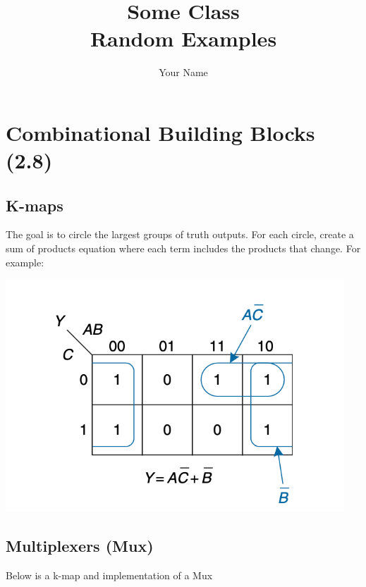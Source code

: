 \documentclass[12pt]{report}
\title{\Huge{Some Class}\\Random Examples}
\author{\huge{Your Name}}
\date{}
\begin{document}
\chapter{Combinational Building Blocks (2.8)}
\section{K-maps}

The goal is to circle the largest groups of truth outputs.
For each circle, create a sum of products equation where each term includes the products that change. For example:

\includegraphics[width=5in]{K-map.png}


\newpage

\section{Multiplexers (Mux)}
Below is a k-map and implementation of a Mux
\end{document}
